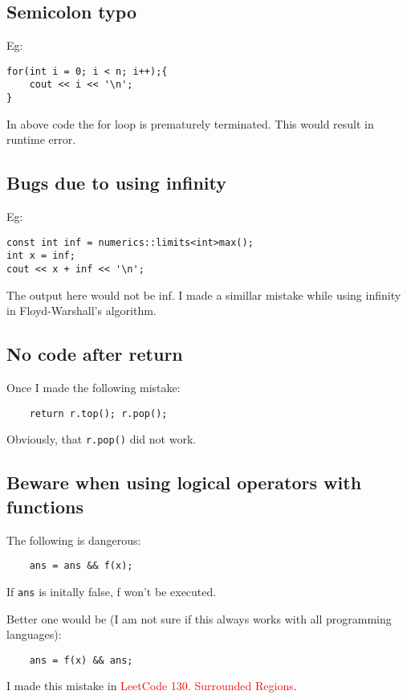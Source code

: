 \subsection{Semicolon typo}
Eg: 
\begin{verbatim}
for(int i = 0; i < n; i++);{
    cout << i << '\n';
}
\end{verbatim}
In above code the for loop is prematurely terminated. This would result in runtime error.

\subsection{Bugs due to using infinity}{
Eg:\\
\begin{verbatim}
const int inf = numerics::limits<int>max();
int x = inf;
cout << x + inf << '\n';
\end{verbatim}
}
The output here would not be inf. I made a simillar mistake while using infinity in Floyd-Warshall's algorithm.

\subsection{No code after return}

Once I made the following mistake:

\begin{verbatim}
	return r.top(); r.pop();	
\end{verbatim}
Obviously, that \verb!r.pop()! did not work.

\subsection{Beware when using logical operators with functions}

The following is dangerous:

\begin{verbatim}
	ans = ans && f(x);
\end{verbatim}

If \texttt{ans} is initally false, f won't be executed.	

Better one would be (I am not sure if this always works with all programming languages):

\begin{verbatim}
	ans = f(x) && ans; 
\end{verbatim}

I made this mistake in \textcolor{red}{LeetCode 130. Surrounded Regions}.

